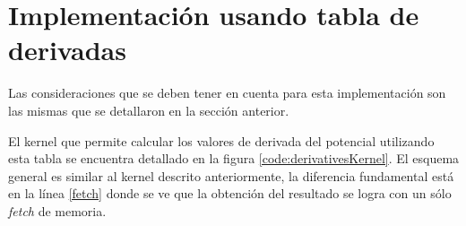 \section{Implementación usando tabla de derivadas}

Las consideraciones que se deben tener en cuenta para esta implementación son las mismas que se detallaron en la sección anterior.


El kernel que permite calcular los valores de derivada del potencial utilizando esta tabla se encuentra detallado en la figura \ref{code:derivativesKernel}.
El esquema general es similar al kernel descrito anteriormente, la diferencia fundamental está en la línea \ref{fetch} donde se ve que la obtención del resultado se logra con un sólo \textit{fetch} de memoria.

